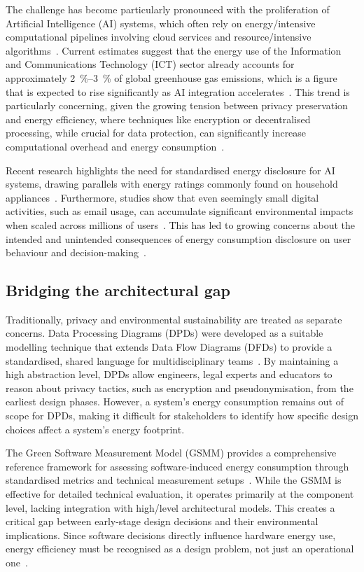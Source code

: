 The challenge has become particularly pronounced with the proliferation of Artificial Intelligence (AI) systems, which often rely on energy\-/intensive computational pipelines involving cloud services and resource\-/intensive algorithms~\cite{berthelot2024estimating,lannelongue2021green}.
Current estimates suggest that the energy use of the Information and Communications Technology (ICT) sector already accounts for approximately \qtyrange{2}{3}{\percent} of global greenhouse gas emissions, which is a figure that is expected to rise significantly as AI integration accelerates~\cite{guldner2024development}.
This trend is particularly concerning, given the growing tension between privacy preservation and energy efficiency, where techniques like encryption or decentralised processing, while crucial for data protection, can significantly increase computational overhead and energy consumption~\cite{bieker2025data}.

Recent research highlights the need for standardised energy disclosure for AI systems, drawing parallels with energy ratings commonly found on household appliances~\cite{luccioni2024light}.
Furthermore, studies show that even seemingly small digital activities, such as email usage, can accumulate significant environmental impacts when scaled across millions of users~\cite{siy2025elitter}.
This has led to growing concerns about the intended and unintended consequences of energy consumption disclosure on user behaviour and decision-making~\cite{klesel2026good}.

\subsection{Bridging the architectural gap}
Traditionally, privacy and environmental sustainability are treated as separate concerns.
Data Processing Diagrams (DPDs) were developed as a suitable modelling technique that extends Data Flow Diagrams (DFDs) to provide a standardised, shared language for multidisciplinary teams~\cite{bieker2025data,yourdon1979structured}.
By maintaining a high abstraction level, DPDs allow engineers, legal experts and educators to reason about privacy tactics, such as encryption and pseudonymisation, from the earliest design phases.
However, a system's energy consumption remains out of scope for DPDs, making it difficult for stakeholders to identify how specific design choices affect a system's energy footprint.

The Green Software Measurement Model (GSMM) provides a comprehensive reference framework for assessing soft\-ware-induced energy consumption through standardised metrics and technical measurement setups~\cite{guldner2024development}.
While the GSMM is effective for detailed technical evaluation, it operates primarily at the component level, lacking integration with high\-/level architectural models.
This creates a critical gap between early-stage design decisions and their environmental implications.
Since software decisions directly influence hardware energy use, energy efficiency must be recognised as a design problem, not just an operational one~\cite{hindle2012green}.

